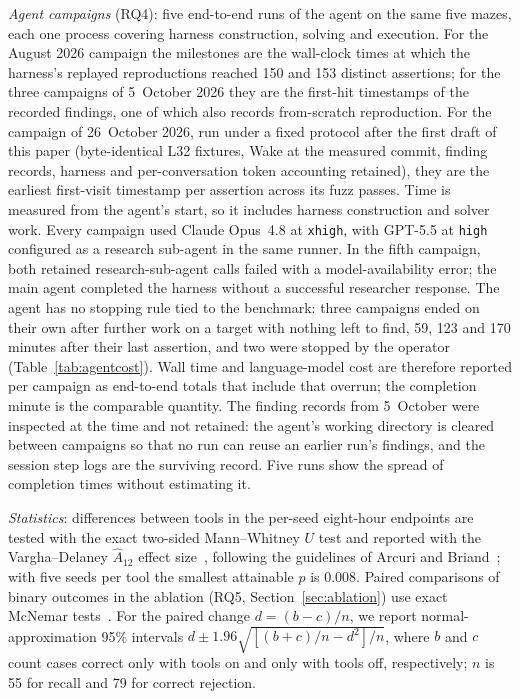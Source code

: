 \documentclass[11pt,a4paper]{article}
\newcommand{\wake}{Wake}
\begin{document}
\emph{Agent campaigns} (RQ4): five end-to-end runs of the agent on the same five mazes, each one process covering harness construction, solving and execution. For the August 2026 campaign the milestones are the wall-clock times at which the harness's replayed reproductions reached 150 and 153 distinct assertions; for the three campaigns of 5~October 2026 they are the first-hit timestamps of the recorded findings, one of which also records from-scratch reproduction. For the campaign of 26~October 2026, run under a fixed protocol after the first draft of this paper (byte-identical L32 fixtures, \wake{} at the measured commit, finding records, harness and per-conversation token accounting retained), they are the earliest first-visit timestamp per assertion across its fuzz passes. Time is measured from the agent's start, so it includes harness construction and solver work. Every campaign used Claude Opus~4.8 at \texttt{xhigh}, with GPT-5.5 at \texttt{high} configured as a research sub-agent in the same runner. In the fifth campaign, both retained research-sub-agent calls failed with a model-availability error; the main agent completed the harness without a successful researcher response. The agent has no stopping rule tied to the benchmark: three campaigns ended on their own after further work on a target with nothing left to find, 59, 123 and 170 minutes after their last assertion, and two were stopped by the operator (Table~\ref{tab:agentcost}). Wall time and language-model cost are therefore reported per campaign as end-to-end totals that include that overrun; the completion minute is the comparable quantity. The finding records from 5~October were inspected at the time and not retained: the agent's working directory is cleared between campaigns so that no run can reuse an earlier run's findings, and the session step logs are the surviving record. Five runs show the spread of completion times without estimating it.

\emph{Statistics}: differences between tools in the per-seed eight-hour endpoints are tested with the exact two-sided Mann--Whitney $U$ test and reported with the Vargha--Delaney $\hat{A}_{12}$ effect size~\cite{vargha2000a12}, following the guidelines of Arcuri and Briand~\cite{arcuri2014hitchhiker}; with five seeds per tool the smallest attainable $p$ is 0.008. Paired comparisons of binary outcomes in the ablation (RQ5, Section~\ref{sec:ablation}) use exact McNemar tests~\cite{mcnemar1947}. For the paired change $d=(b-c)/n$, we report normal-approximation 95\% intervals $d\pm1.96\sqrt{[(b+c)/n-d^2]/n}$, where $b$ and $c$ count cases correct only with tools on and only with tools off, respectively; $n$ is 55 for recall and 79 for correct rejection.
\end{document}
